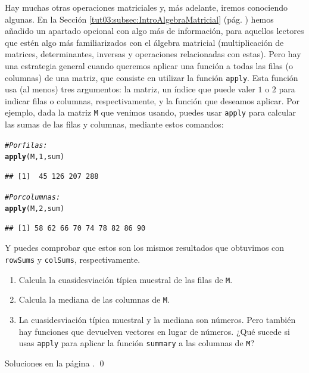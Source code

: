 \documentclass[10pt,a4paper]{article}\usepackage[]{graphicx}\usepackage[]{color}
\makeatletter
\newcommand{\hlnum}[1]{\textcolor[rgb]{0.686,0.059,0.569}{#1}}%
\newcommand{\hlcom}[1]{\textcolor[rgb]{0.678,0.584,0.686}{\textit{#1}}}%
\newcommand{\hlstd}[1]{\textcolor[rgb]{0.345,0.345,0.345}{#1}}%
\newcommand{\hlkwd}[1]{\textcolor[rgb]{0.737,0.353,0.396}{\textbf{#1}}}%
\newenvironment{kframe}{%
 \def\at@end@of@kframe{}%
 \ifinner\ifhmode%
  \def\at@end@of@kframe{\end{minipage}}%
  \begin{minipage}{\columnwidth}%
 \fi\fi%
 \def\FrameCommand##1{\hskip\@totalleftmargin \hskip-\fboxsep
 \colorbox{shadecolor}{##1}\hskip-\fboxsep
     \hskip-\linewidth \hskip-\@totalleftmargin \hskip\columnwidth}%
 \MakeFramed {\advance\hsize-\width
   \@totalleftmargin\z@ \linewidth\hsize
   \@setminipage}}%
 {\par\unskip\endMakeFramed%
 \at@end@of@kframe}
\newenvironment{knitrout}{}{} %
\makeatother
\begin{document}
Hay muchas otras operaciones matriciales y, más adelante, iremos conociendo algunas. En la Sección \ref{tut03:subsec:IntroAlgebraMatricial} (pág. \pageref{tut03:subsec:IntroAlgebraMatricial}) hemos añadido un apartado opcional con algo más de información, para aquellos lectores que estén algo más familiarizados con el álgebra matricial (multiplicación de matrices, determinantes, inversas y operaciones relacionadas con estas). Pero hay una estrategia general cuando queremos aplicar una función a todas las filas (o columnas) de una matriz, que consiste en utilizar la función {\tt apply}. Esta función usa (al menos) tres argumentos: la matriz, un índice que puede valer $1$ o $2$ para indicar filas o columnas, respectivamente, y la función que deseamos aplicar. Por ejemplo, dada la matriz {\tt M} que venimos usando, puedes usar {\tt apply} para calcular las sumas de las filas y columnas, mediante estos comandos:
\begin{knitrout}
\color{fgcolor}\begin{kframe}
\begin{alltt}
    \hlcom{# Por filas:}
    \hlkwd{apply}\hlstd{(M,} \hlnum{1}\hlstd{, sum)}
\end{alltt}
\begin{verbatim}
## [1]  45 126 207 288
\end{verbatim}
\begin{alltt}
    \hlcom{# Por columnas:}
    \hlkwd{apply}\hlstd{(M,} \hlnum{2}\hlstd{, sum)}
\end{alltt}
\begin{verbatim}
## [1] 58 62 66 70 74 78 82 86 90
\end{verbatim}
\end{kframe}
\end{knitrout}
Y puedes comprobar que estos son los mismos resultados que obtuvimos con {\tt rowSums} y {\tt colSums}, respectivamente.
\begin{ejercicio}
\label{tut03:ejercicio07a}
\quad
\begin{enumerate}
  \item Calcula la cuasidesviación típica muestral de las filas de {\tt M}.
  \item Calcula la mediana de las columnas de {\tt M}.
  \item La cuasidesviación típica muestral y la mediana son números. Pero también hay funciones que devuelven vectores en lugar de números. ¿Qué sucede si usas {\tt apply} para aplicar la función {\tt summary} a las columnas de {\tt M}?
\end{enumerate}
Soluciones en la página \pageref{tut03:ejercicio07a:sol}.
\qed
\end{ejercicio}
\end{document}
